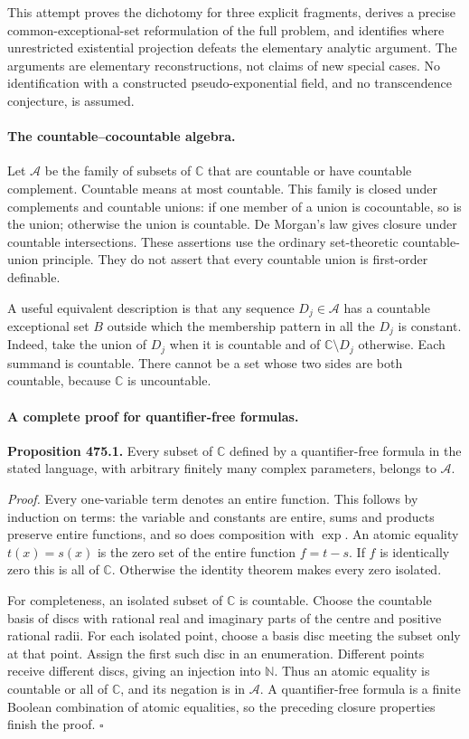 \documentclass[11pt]{article}
\begin{document}
This attempt proves the dichotomy for three explicit fragments, derives
a precise common-exceptional-set reformulation of the full problem,
and identifies where unrestricted existential projection defeats the
elementary analytic argument. The arguments are elementary reconstructions,
not claims of new special cases. No identification with a constructed
pseudo-exponential field, and no transcendence conjecture, is assumed.

\paragraph{The countable--cocountable algebra.}
Let $\mathcal A$ be the family of subsets of $\mathbb C$ that are
countable or have countable complement. Countable means at most countable.
This family is closed under complements and countable unions: if one
member of a union is cocountable, so is the union; otherwise the union is
countable. De Morgan's law gives closure under countable intersections.
These assertions use the ordinary set-theoretic countable-union principle.
They do not assert that every countable union is first-order definable.

A useful equivalent description is that any sequence $D_j\in\mathcal A$
has a countable exceptional set $B$ outside which the membership pattern
in all the $D_j$ is constant. Indeed, take the union of $D_j$ when it is
countable and of $\mathbb C\setminus D_j$ otherwise. Each summand is
countable. There cannot be a set whose two sides are both countable,
because $\mathbb C$ is uncountable.

\paragraph{A complete proof for quantifier-free formulas.}
\textbf{Proposition 475.1.} Every subset of $\mathbb C$ defined by a
quantifier-free formula in the stated language, with arbitrary finitely
many complex parameters, belongs to $\mathcal A$.

\emph{Proof.}
Every one-variable term denotes an entire function. This follows by
induction on terms: the variable and constants are entire, sums and
products preserve entire functions, and so does composition with $\exp$.
An atomic equality $t(x)=s(x)$ is the zero set of the entire function
$f=t-s$. If $f$ is identically zero this is all of $\mathbb C$. Otherwise
the identity theorem makes every zero isolated.

For completeness, an isolated subset of $\mathbb C$ is countable.
Choose the countable basis of discs with rational real and imaginary
parts of the centre and positive rational radii. For each isolated point,
choose a basis disc meeting the subset only at that point. Assign the
first such disc in an enumeration. Different points receive different
discs, giving an injection into $\mathbb N$. Thus an atomic equality is
countable or all of $\mathbb C$, and its negation is in $\mathcal A$.
A quantifier-free formula is a finite Boolean combination of atomic
equalities, so the preceding closure properties finish the proof.
\hfill$\square$
\end{document}

